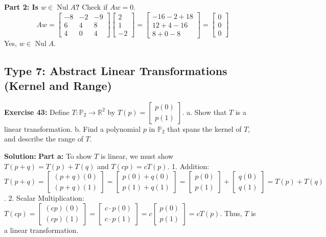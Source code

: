 \documentclass[11pt]{article}
\begin{document}
\textbf{Part 2: Is $w \in \operatorname{Nul} A$?}
Check if $Aw = 0$.
\[
Aw = \begin{bmatrix} -8 & -2 & -9 \\ 6 & 4 & 8 \\ 4 & 0 & 4 \end{bmatrix} \begin{bmatrix} 2 \\ 1 \\ -2 \end{bmatrix} = \begin{bmatrix} -16 - 2 + 18 \\ 12 + 4 - 16 \\ 8 + 0 - 8 \end{bmatrix} = \begin{bmatrix} 0 \\ 0 \\ 0 \end{bmatrix}
\]
Yes, $w \in \operatorname{Nul} A$.

\subsection{Type 7: Abstract Linear Transformations (Kernel and Range)}

\textbf{Exercise 43:} Define $T: \mathbb{P}_2 \to \mathbb{R}^2$ by $T(p) = \begin{bmatrix} p(0) \\ p(1) \end{bmatrix}$.
a. Show that $T$ is a linear transformation.
b. Find a polynomial $p$ in $\mathbb{P}_2$ that spans the kernel of $T$, and describe the range of $T$.

\textbf{Solution:}
\textbf{Part a:} To show $T$ is linear, we must show $T(p+q) = T(p) + T(q)$ and $T(cp) = cT(p)$.
1. Addition: $T(p+q) = \begin{bmatrix} (p+q)(0) \\ (p+q)(1) \end{bmatrix} = \begin{bmatrix} p(0) + q(0) \\ p(1) + q(1) \end{bmatrix} = \begin{bmatrix} p(0) \\ p(1) \end{bmatrix} + \begin{bmatrix} q(0) \\ q(1) \end{bmatrix} = T(p) + T(q)$.
2. Scalar Multiplication: $T(cp) = \begin{bmatrix} (cp)(0) \\ (cp)(1) \end{bmatrix} = \begin{bmatrix} c \cdot p(0) \\ c \cdot p(1) \end{bmatrix} = c \begin{bmatrix} p(0) \\ p(1) \end{bmatrix} = cT(p)$.
Thus, $T$ is a linear transformation.
\end{document}
